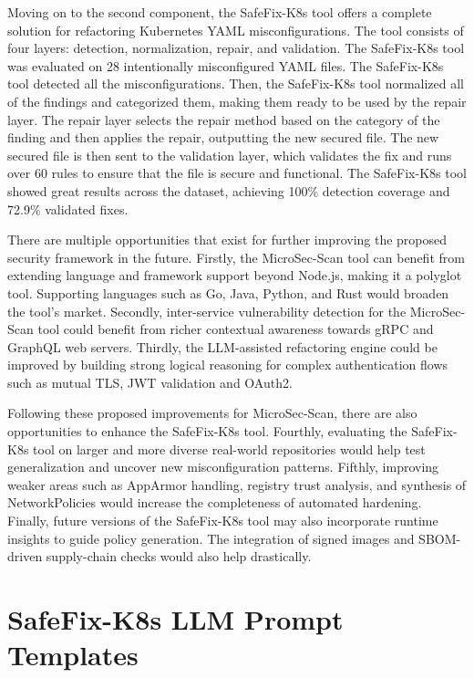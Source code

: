 \documentclass[preprint,12pt]{elsarticle}
\renewcommand{\thesection}{\Roman{section}}
\begin{document}
Moving on to the second component, the SafeFix-K8s tool offers a complete solution for refactoring Kubernetes YAML misconfigurations. The tool consists of four layers: detection, normalization, repair, and validation. The SafeFix-K8s tool was evaluated on 28 intentionally misconfigured YAML files. The SafeFix-K8s tool detected all the misconfigurations. Then, the SafeFix-K8s tool normalized all of the findings and categorized them, making them ready to be used by the repair layer. The repair layer selects the repair method based on the category of the finding and then applies the repair, outputting the new secured file. The new secured file is then sent to the validation layer, which validates the fix and runs over 60 rules to ensure that the file is secure and functional. The SafeFix-K8s tool showed great results across the dataset, achieving 100\% detection coverage and 72.9\% validated fixes. 

There are multiple opportunities that exist for further improving the proposed security framework in the future. Firstly, the MicroSec-Scan tool can benefit from extending language and framework support beyond Node.js, making it a polyglot tool. Supporting languages such as Go, Java, Python, and Rust would broaden the tool's market. Secondly, inter-service vulnerability detection for the MicroSec-Scan tool could benefit from richer contextual awareness towards gRPC and GraphQL web servers. Thirdly, the LLM-assisted refactoring engine could be improved by building strong logical reasoning for complex authentication flows such as mutual TLS, JWT validation and OAuth2.

Following these proposed improvements for MicroSec-Scan, there are also opportunities to enhance the SafeFix-K8s tool. Fourthly, evaluating the SafeFix-K8s tool on larger and more diverse real-world repositories would help test generalization and uncover new misconfiguration patterns. Fifthly, improving weaker areas such as AppArmor handling, registry trust analysis, and synthesis of NetworkPolicies would increase the completeness of automated hardening. Finally, future versions of the SafeFix-K8s tool may also incorporate runtime insights to guide policy generation. The integration of signed images and SBOM-driven supply-chain checks would also help drastically.







\appendix
\renewcommand{\thesection}{\Alph{section}}
\section{SafeFix-K8s LLM Prompt Templates}
\label{app:llm-prompt}
\end{document}

